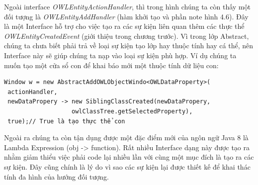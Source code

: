 Ngoài interface \textit{OWLEntityActionHandler}, thì trong hình chúng ta còn thấy một đối tượng là \textit{OWLEntityAddHandler} (hàm khởi tạo và phần note hình 4.6). Đây là một Interface hỗ trợ cho việc tạo ra các sự kiện liên quan thêm các thực thể \textit{OWLEntityCreatedEvent} (giới thiệu trong chương trước). Vì trong lớp Abstract, chúng ta chưa biết phải trả về loại sự kiện tạo lớp hay thuộc tính hay cá thể, nên Interface này sẽ giúp chúng ta nạp vào loại sự kiện phù hợp. Ví dụ chúng ta muốn tạo một cửa sổ con để khai báo mới một thuộc tính dữ liệu con:
\begin{verbatim}
Window w = new AbstractAddOWLObjectWindo<OWLDataProperty>(
 actionHandler,
 newDataPropery -> new SiblingClassCreated(newDataPropery, 
                   owlClassTree.getSelectedProperty),
 true);// True là tạo thực thể con
\end{verbatim}
Ngoài ra chúng ta còn tận dụng được một đặc điểm mới của ngôn ngữ Java 8 là Lambda Expression (obj -> function). Rất nhiều Interface dạng này được tạo ra nhằm giảm thiểu việc phải code lại nhiều lần với cùng một mục đích là tạo ra các sự kiện. Đây cũng chính là lý do vì sao các sự kiện lại được thiết kế để khai thác tính đa hình của hướng đối tượng.

